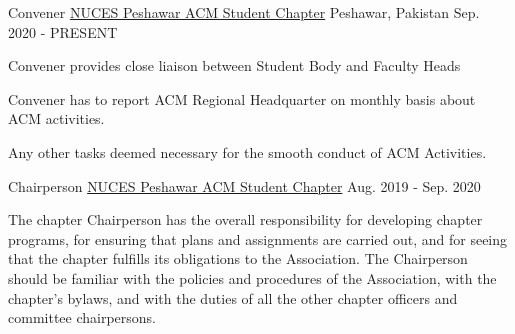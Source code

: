 


\begin{cventries}


\cventry
{Convener} %
{\href{http://pwr.nu.edu.pk/acm/}{NUCES Peshawar ACM Student Chapter}} %
{Peshawar, Pakistan} %
{Sep. 2020 - PRESENT} %
{ %
\begin{cvitems}
\item {Convener provides close liaison between Student Body and Faculty Heads}
\item {Convener has to report ACM Regional Headquarter on monthly basis about ACM activities.}
\item {Any other tasks deemed necessary for the smooth conduct of ACM Activities.}
\end{cvitems}
}


\cventry
{Chairperson} %
{\href{http://pwr.nu.edu.pk/acm/}{NUCES Peshawar ACM Student Chapter}} %
{Aug. 2019 - Sep. 2020} %
{ %
\begin{cvitems}
\begin{flushleft} \justifying
The chapter Chairperson has the overall responsibility for developing chapter programs, for ensuring that plans and assignments are carried out, and for seeing that the chapter fulfills its obligations to the Association. The Chairperson should be familiar with the policies and procedures of the Association, with the chapter's bylaws, and with the duties of all the other chapter officers and committee chairpersons.
\end{flushleft}
\end{cvitems}
}


\end{cventries}
